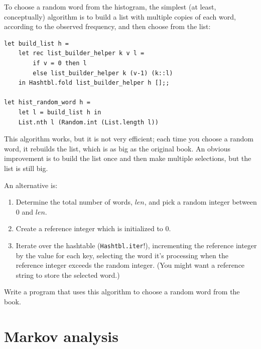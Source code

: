 \documentclass[10pt]{book}
\begin{document}
To choose a random word from the histogram, the simplest (at least, conceptually) algorithm
is to build a list with multiple copies of each word, according
to the observed frequency, and then choose from the list:
\beforeverb
\begin{verbatim}
let build_list h = 
	let rec list_builder_helper k v l = 
		if v = 0 then l
		else list_builder_helper k (v-1) (k::l)
	in Hashtbl.fold list_builder_helper h [];;

let hist_random_word h = 
	let l = build_list h in
	List.nth l (Random.int (List.length l))\end{verbatim}
\afterverb
%

\begin{ex}
\label{randhist}


This algorithm works, but it is not very efficient; each time you
choose a random word, it rebuilds the list, which is as big as
the original book.  An obvious improvement is to build the list
once and then make multiple selections, but the list is still big.

An alternative is:

\begin{enumerate}

\item Determine the total number of words, $len$, and pick a random integer between $0$ and $len$.

\item Create a reference integer which is initialized to 0.
  
\item Iterate over the hashtable ({\tt Hashtbl.iter}!), incrementing the reference integer by the value for each key, selecting the word it's processing when the reference integer exceeds the random integer. (You might want a reference string to store the selected word.)

\end{enumerate}

Write a program that uses this algorithm to choose a random
word from the book.
\end{ex}



\section{Markov analysis}

\end{document}
